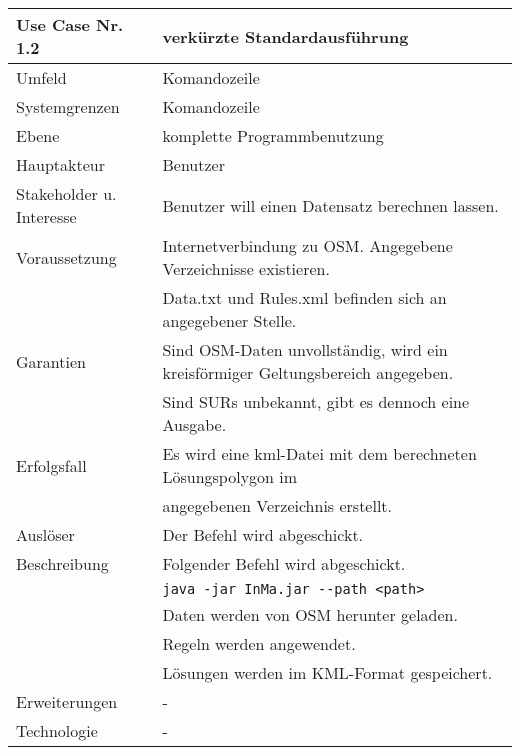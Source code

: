\begin{tabular}{| l | l |}
 \hline
 \textbf{Use Case Nr. 1.2} & verkürzte Standardausführung\\
 \hline
 Umfeld & Komandozeile\\
 \hline
 Systemgrenzen & Komandozeile\\
 \hline
 Ebene & komplette Programmbenutzung\\
 \hline
 Hauptakteur & Benutzer\\
 \hline
 Stakeholder u. Interesse & Benutzer will einen Datensatz berechnen lassen.\\
 \hline
 Voraussetzung & Internetverbindung zu OSM. Angegebene Verzeichnisse existieren.\\
        & Data.txt und Rules.xml befinden sich an angegebener Stelle. \\
 \hline
 Garantien & Sind OSM-Daten unvollständig, wird ein kreisförmiger Geltungsbereich angegeben.\\
    & Sind SURs unbekannt, gibt es dennoch eine Ausgabe.\\
 \hline
 Erfolgsfall & Es wird eine kml-Datei mit dem berechneten Lösungspolygon im\\
      & angegebenen Verzeichnis erstellt.\\
 \hline
 Auslöser & Der Befehl wird abgeschickt.\\
 \hline
 Beschreibung & Folgender Befehl wird abgeschickt.\\
      & \verb|java -jar InMa.jar --path <path>|\\
      & Daten werden von OSM herunter geladen.\\
      & Regeln werden angewendet.\\
      & Lösungen werden im KML-Format gespeichert.\\
 \hline
 Erweiterungen & -\\
 \hline
 Technologie & -\\
 \hline
\end{tabular}



